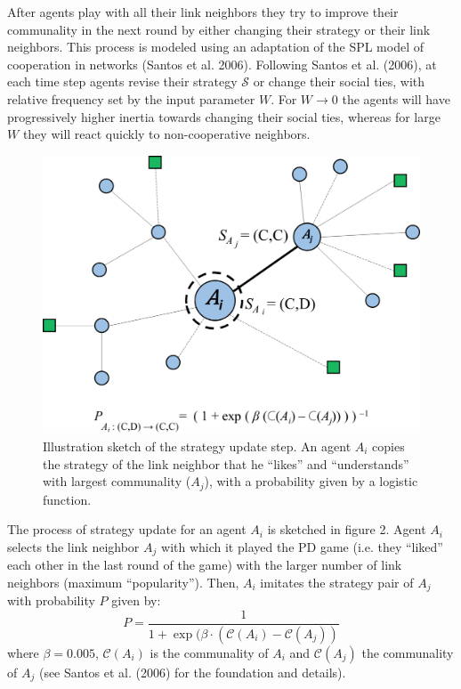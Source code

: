 After agents play with all their link neighbors they try to improve their communality in the next round by either changing their strategy or their link neighbors. This process is modeled using an adaptation of the SPL model of cooperation in networks (Santos et al. 2006). Following Santos et al. (2006), at each time step agents revise their strategy $ \mathcal{S} $ or change their social ties, with relative frequency set by the input parameter $ W $. For $ W \to 0 $ the agents will have progressively higher inertia towards changing their social ties, whereas for large $ W $ they will react quickly to non-cooperative neighbors.
\begin{figure}[t!]
	\label{fig:StrategyUpdate}
	\centering\includegraphics[width=0.85\linewidth]{figures/StrategyUpdate}
	\caption{Illustration sketch of the strategy update step. An agent $ A_i $ copies the strategy of the link neighbor that he ``likes'' and ``understands'' with largest communality ($ A_{j} $), with a probability given by a logistic function.}
\end{figure}



The process of strategy update for an agent $ A_{i} $ is sketched in figure 2. Agent $ A_{i} $ selects the link neighbor $ A_{j} $ with which it played the PD game (i.e. they ``liked'' each other in the last round of the game) with the larger number of link neighbors (maximum ``popularity''). Then, $ A_{i} $ imitates the strategy pair of $ A_{j} $ with probability $ P $ given by:
\begin{equation}
\label{eq:8}
P = \frac{1}{1 + \exp (\beta \cdot (\mathcal{C}(A_i) - \mathcal{C}(A_j))}
\end{equation}
where $ \beta = 0.005 $, $ \mathcal{C}(A_i) $ is the communality of $ A_i $ and $ \mathcal{C}(A_j) $ the communality of $ A_j $ (see Santos et al. (2006) for the foundation and details). 

